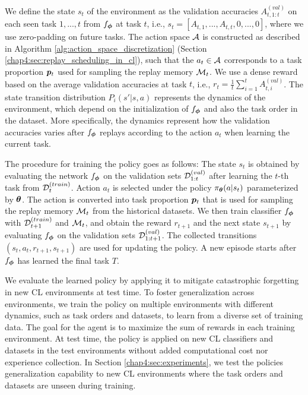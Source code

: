 We define the state $s_t$ of the environment as the validation accuracies $A_{t, 1:t}^{(val)}$ on each seen task $1, ..., t$ from $f_{{\bm{\phi}}}$ at task $t$, i.e., $s_t = [A_{t, 1}, ..., A_{t, t}, 0, ..., 0]$, where we use zero-padding on future tasks. The action space ${\mathcal{A}}$ is constructed as described in Algorithm \ref{alg:action_space_discretization} (Section \ref{chap4:sec:replay_scheduling_in_cl}), such that the $a_t \in {\mathcal{A}}$ corresponds to a task proportion ${\bm{p}}_t$ used for sampling the replay memory ${\mathcal{M}}_t$. We use a dense reward based on the average validation accuracies at task $t$, i.e., $r_{t} = \frac{1}{t}\sum_{i=1}^{t} A_{t, i}^{(val)}$. The state transition distribution $P_i(s' | s, a)$ represents the dynamics of the environment, which depend on the initialization of $f_{{\bm{\phi}}}$ and also the task order in the dataset. More specifically, the dynamics represent how the validation accuracies varies after $f_{{\bm{\phi}}}$ replays according to the action $a_t$ when learning the current task. 

The procedure for training the policy goes as follows: 
The state $s_t$ is obtained by evaluating the network $f_{{\bm{\phi}}}$ on the validation sets ${\mathcal{D}}_{1:t}^{(val)}$ after learning the $t$-th task from ${\mathcal{D}}_t^{(train)}$. Action $a_t$ is selected under the policy $\pi_{{\bm{\theta}}}(a | s_t)$ parameterized by ${\bm{\theta}}$. The action is converted into task proportion ${\bm{p}}_t$ that is used for sampling the replay memory ${\mathcal{M}}_t$ from the historical datasets. 
We then train classifier $f_{{\bm{\phi}}}$ with ${\mathcal{D}}_{t+1}^{(train)}$ and ${\mathcal{M}}_t$, and obtain the reward $r_{t+1}$ and the next state $s_{t+1}$ by evaluating $f_{{\bm{\phi}}}$ on the validation sets ${\mathcal{D}}_{1:t+1}^{(val)}$. The collected transitions $(s_t, a_t, r_{t+1}, s_{t+1})$ are used for updating the policy.  A new episode starts after $f_{{\bm{\phi}}}$ has learned the final task $T$. 

We evaluate the learned policy by applying it to mitigate catastrophic forgetting in new CL environments at test time. To foster generalization across environments, we train the policy on multiple environments with different dynamics, such as task orders and datasets, to learn from a diverse set of training data. The goal for the agent is to maximize the sum of rewards in each training environment. 
At test time, the policy is applied on new CL classifiers and datasets in the test environments without added computational cost nor experience collection. In Section \ref{chap4:sec:experiments}, we test the policies generalization capability to new CL environments where the task orders and datasets are unseen during training.


